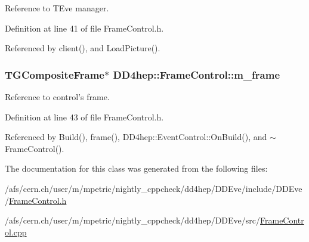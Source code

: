 Reference to TEve manager. 

Definition at line 41 of file FrameControl.h.

Referenced by client(), and LoadPicture().\hypertarget{class_d_d4hep_1_1_frame_control_aae98fb770d6e50d5df6ed082cd5118ac}{
\subsubsection[{m\_\-frame}]{\setlength{\rightskip}{0pt plus 5cm}TGCompositeFrame$\ast$ {\bf DD4hep::FrameControl::m\_\-frame}}}
\label{class_d_d4hep_1_1_frame_control_aae98fb770d6e50d5df6ed082cd5118ac}


Reference to control's frame. 

Definition at line 43 of file FrameControl.h.

Referenced by Build(), frame(), DD4hep::EventControl::OnBuild(), and $\sim$FrameControl().

The documentation for this class was generated from the following files:\begin{DoxyCompactItemize}
\item 
/afs/cern.ch/user/m/mpetric/nightly\_\-cppcheck/dd4hep/DDEve/include/DDEve/\hyperlink{_frame_control_8h}{FrameControl.h}\item 
/afs/cern.ch/user/m/mpetric/nightly\_\-cppcheck/dd4hep/DDEve/src/\hyperlink{_frame_control_8cpp}{FrameControl.cpp}\end{DoxyCompactItemize}
